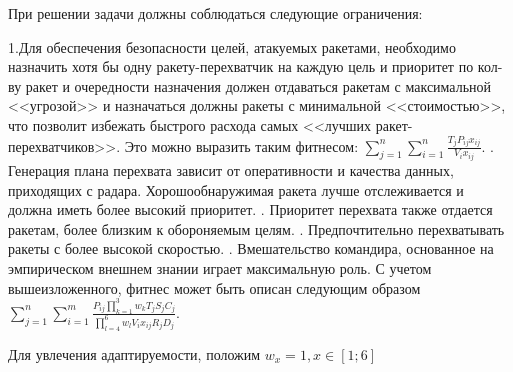 При решении задачи должны соблюдаться следующие ограничения:

1.Для обеспечения безопасности целей, атакуемых ракетами, необходимо назначить хотя бы одну ракету-перехватчик на каждую цель и приоритет по кол-ву ракет и очередности назначения должен отдаваться ракетам с максимальной <<угрозой>>  и назначаться должны ракеты с минимальной <<стоимостью>>, что позволит избежать быстрого расхода самых <<лучших ракет-перехватчиков>>. Это можно выразить таким фитнесом:
$\sum_{j=1}^{n} \sum_{i=1}^{n}  \frac{T_{j}P_{ij} x_{ij}}{V_{i}x_{ij}}$. 
. Генерация плана перехвата зависит от оперативности и качества данных, приходящих с радара. Хорошообнаружимая ракета лучше отслеживается и должна иметь более высокий приоритет.  
. Приоритет перехвата также отдается ракетам, более близким к обороняемым целям.
. Предпочтительно перехватывать ракеты с более высокой скоростью.
. Вмешательство командира, основанное на эмпирическом внешнем знании играет максимальную роль.
\newline
С учетом вышеизложенного, фитнес может быть описан следующим образом 
$\sum_{j=1}^{n}\sum_{i=1}^{m} \frac{P_{ij} \prod_{k=1}^{3}w_k T_j   S_j   C_j}{\prod_{l=4}^{6} w_l V_i x_{ij}  R_j D_j}$.

Для увлечения адаптируемости,  положим $w_x = 1, x \in [1; 6] $ 
\newpage %